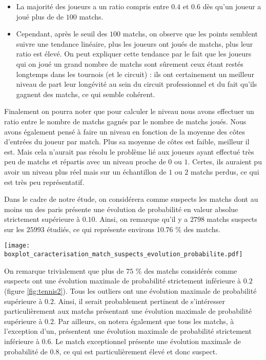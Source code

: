 \documentclass{article}
\begin{document}
\begin{multicols}{2}
\begin{itemize}
  \item La majorité des joueurs a un ratio compris entre $0.4$ et $0.6$ dès qu’un joueur a joué plus de de $100$ matchs.
  
  \item Cependant, après le seuil des $100$ matchs, on observe que les points semblent suivre une tendance linéaire, plus les joueurs ont joués de matchs, plus leur ratio est élevé. On peut expliquer cette tendance par le fait que les joueurs qui on joué un grand nombre de matchs sont sûrement ceux étant restés longtemps dans les tournois (et le circuit) : ils ont certainement un meilleur niveau de part leur longévité au sein du circuit professionnel et du fait qu'ils gagnent des matchs, ce qui semble cohérent.

\end{itemize}

Finalement on pourra noter que pour calculer le niveau nous avons effectuer un ratio entre le nombre de matchs gagnés par le nombre de matchs joués. Nous avons également pensé à faire un niveau en fonction de la moyenne des côtes d'entrées du joueur par match. Plus sa moyenne de côtes est faible, meilleur il est. Mais cela n'aurait pas résolu le problème lié aux joueurs ayant effectué très peu de matchs et répartis avec un niveau proche de $0$ ou $1$. Certes, ils auraient pu avoir un niveau plus réel mais sur un échantillon de $1$ ou $2$ matchs perdus, ce qui est très peu représentatif.


Dans le cadre de notre étude, on considérera comme suspects les matchs dont au moins un des paris présente une évolution de probabilité en valeur absolue strictement supérieure à $0.10$. Ainsi, on remarque qu'il y a $2798$ matchs suspects sur les $25993$ étudiés, ce qui représente environs $10.76$ \% des matchs.

\begingroup
    \centering
   \texttt{[image: boxplot\_caracterisation\_match\_suspects\_evolution\_probabilite.pdf]}
    \label{fig:tennis2}
\endgroup

On remarque trivialement que plus de $75$ \% des matchs considérés comme suspects ont une évolution maximale de probabilité strictement inférieure à $0.2$  (figure \ref{fig:tennis2}). Tous les outliers ont une évolution maximale de probabilité supérieure à $0.2$. Ainsi, il serait probablement pertinent de s'intéresser particulièrement aux matchs présentant une évolution maximale de probabilité supérieure à $0.2$. Par ailleurs, on notera également que tous les matchs, à l'exception d'un, présentent une évolution maximale de probabilité strictement inférieure à $0.6$. Le match exceptionnel présente une évolution maximale de probabilité de $0.8$, ce qui est particulièrement élevé et donc suspect.


\end{multicols}
\end{document}
